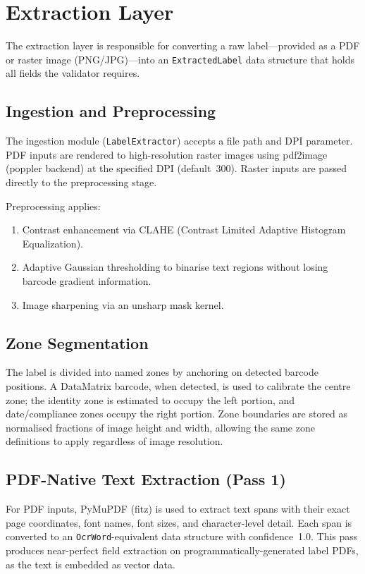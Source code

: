 \section{Extraction Layer}

The extraction layer is responsible for converting a raw label—provided as a PDF or raster
image (PNG/JPG)—into an \texttt{ExtractedLabel} data structure that holds all fields the
validator requires.

\subsection{Ingestion and Preprocessing}

The ingestion module (\texttt{LabelExtractor}) accepts a file path and DPI parameter.
PDF inputs are rendered to high-resolution raster images using pdf2image (poppler backend)
at the specified DPI (default~300). Raster inputs are passed directly to the preprocessing
stage.

Preprocessing applies:
\begin{enumerate}
  \item Contrast enhancement via CLAHE (Contrast Limited Adaptive Histogram Equalization).
  \item Adaptive Gaussian thresholding to binarise text regions without losing barcode gradient
  information.
  \item Image sharpening via an unsharp mask kernel.
\end{enumerate}

\subsection{Zone Segmentation}

The label is divided into named zones by anchoring on detected barcode positions. A
DataMatrix barcode, when detected, is used to calibrate the centre zone; the identity zone
is estimated to occupy the left portion, and date/compliance zones occupy the right portion.
Zone boundaries are stored as normalised fractions of image height and width, allowing the
same zone definitions to apply regardless of image resolution.

\subsection{PDF-Native Text Extraction (Pass 1)}

For PDF inputs, PyMuPDF (fitz) is used to extract text spans with their exact page
coordinates, font names, font sizes, and character-level detail. Each span is converted to
an \texttt{OcrWord}-equivalent data structure with confidence~1.0. This pass produces
near-perfect field extraction on programmatically-generated label PDFs, as the text is
embedded as vector data.

